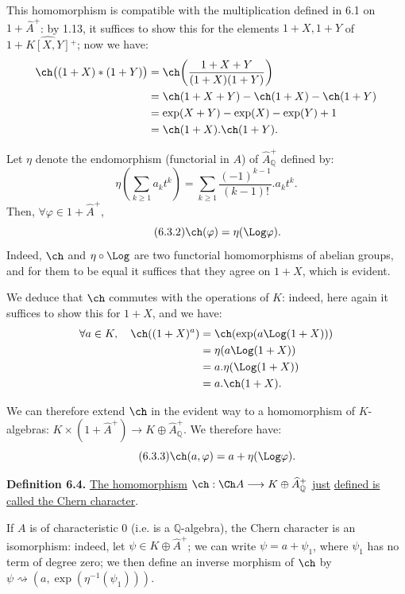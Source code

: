 This homomorphism is compatible with the multiplication defined in 6.1 on \(1+\widehat A^+\): by 1.13, it suffices to show this for the elements \(1+X,1+Y\) of \(1+\widehat{K[X,Y]}{}^{+}\); now we have:
\[
\begin{aligned}
 \ch\bigl((1+X)*(1+Y)\bigr)
 &= \ch\!\left(\frac{1+X+Y}{(1+X)(1+Y)}\right)\\
 &= \ch(1+X+Y)-\ch(1+X)-\ch(1+Y)\\
 &= \exp(X+Y)-\exp(X)-\exp(Y)+1\\
 &= \ch(1+X).\ch(1+Y).
\end{aligned}
\]

Let \(\eta\) denote the endomorphism (functorial in \(A\)) of \(\widehat A_{\mathbb Q}^{+}\) defined by:
\[
 \eta\!\left(\sum_{k\ge1} a_k t^k\right)
 =
 \sum_{k\ge1}\frac{(-1)^{k-1}}{(k-1)!}.a_k t^k.
\]
Then, \(\forall\varphi\in1+\widehat A^+\),
\begin{equation}\tag{6.3.2}
  \ch(\varphi)=\eta(\Log\varphi).
\end{equation}
Indeed, \(\ch\) and \(\eta\circ\Log\) are two functorial homomorphisms of abelian groups, and for them to be equal it suffices that they agree on \(1+X\), which is evident.

We deduce that \(\ch\) commutes with the operations of \(K\): indeed, here again it suffices to show this for \(1+X\), and we have:
\[
\begin{aligned}
 \forall a\in K,\quad\ch((1+X)^a)
 &=\ch(\exp(a\Log(1+X)))\\
 &=\eta(a\Log(1+X))\\
 &=a.\eta(\Log(1+X))\\
 &=a.\ch(1+X).
\end{aligned}
\]

%
We can therefore extend \(\ch\) in the evident way to a homomorphism of \(K\)-algebras: \(K\times(1+\widehat A^+)\longrightarrow K\oplus\widehat A_{\mathbb Q}^{+}\). We therefore have:
\begin{equation}\tag{6.3.3}
  \ch(a,\varphi)=a+\eta(\Log\varphi).
\end{equation}

\textbf{Definition 6.4.} \uline{The homomorphism} \(\ch:\Ch A\longrightarrow K\oplus\widehat A_{\mathbb Q}^{+}\) \uline{just} \uline{defined is called the Chern character}.

If \(A\) is of characteristic \(0\) (i.e. is a \(\mathbb Q\)-algebra), the Chern character is an isomorphism: indeed, let \(\psi\in K\oplus\widehat A^+\); we can write \(\psi=a+\psi_1\), where \(\psi_1\) has no term of degree zero; we then define an inverse morphism of \(\ch\) by \(\psi\rightsquigarrow(a,\exp(\eta^{-1}(\psi_1)))\).

